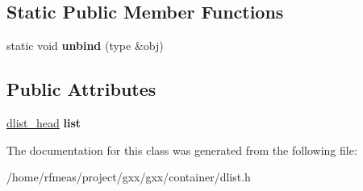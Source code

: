 \subsection*{Static Public Member Functions}
\begin{DoxyCompactItemize}
\item 
static void {\bfseries unbind} (type \&obj)\hypertarget{classgxx_1_1dlist_a2e6fe4d424e9561d3413bf4aa480edd3}{}\label{classgxx_1_1dlist_a2e6fe4d424e9561d3413bf4aa480edd3}

\end{DoxyCompactItemize}
\subsection*{Public Attributes}
\begin{DoxyCompactItemize}
\item 
\hyperlink{structdlist__head}{dlist\+\_\+head} {\bfseries list}\hypertarget{classgxx_1_1dlist_a9b4e92dd9b250e9226f2e983c111b213}{}\label{classgxx_1_1dlist_a9b4e92dd9b250e9226f2e983c111b213}

\end{DoxyCompactItemize}


The documentation for this class was generated from the following file\+:\begin{DoxyCompactItemize}
\item 
/home/rfmeas/project/gxx/gxx/container/dlist.\+h\end{DoxyCompactItemize}

